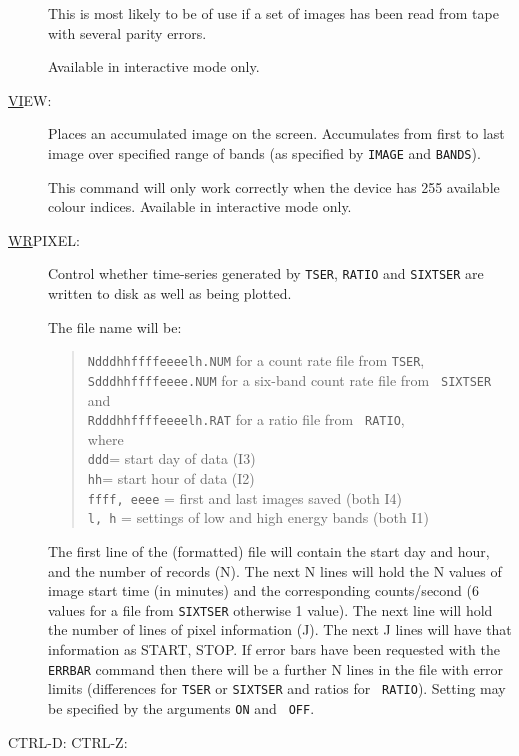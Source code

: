 \begin{description}
This is most likely to be of use if a set of images has been read from
tape with several parity errors.

Available in interactive mode only.

\item[\underline{VI}EW: ] \label{vi}
Places an accumulated image on the screen.  Accumulates from first to
last image over specified range of bands (as specified by {\tt IMAGE}
and {\tt BANDS}).

This command will only work correctly when the device has 255 available
colour indices.  Available in interactive mode only.

\item[\underline{WR}PIXEL: ]  \label{wr}
Control whether time-series generated by {\tt TSER}, {\tt RATIO} and
{\tt SIXTSER} are written to disk as well as being plotted.

The file name will be:
\begin{quote}
{\tt Ndddhhffffeeeelh.NUM} for a count rate file from {\tt TSER},\\
{\tt Sdddhhffffeeee.NUM} for a six-band count rate file from {\tt
SIXTSER} and \\ {\tt Rdddhhffffeeeelh.RAT} for a ratio file from {\tt
RATIO},\\ where\\ {\tt ddd}= start day of data (I3)\\ {\tt hh}= start
hour of data (I2)\\ {\tt ffff, eeee} = first and last images saved
(both I4)\\ {\tt l, h} = settings of low and high energy bands (both
I1)
\end{quote}

The first line of the (formatted) file will contain the start day and
hour, and the number of records (N).  The next N lines will hold the N
values of image start time (in minutes) and the corresponding
counts/second (6 values for a file from {\tt SIXTSER} otherwise 1
value).  The next line will hold the number of lines of pixel
information (J).  The next J lines will have that information as START,
STOP.  If error bars have been requested with the {\tt ERRBAR} command
then there will be a further N lines in the file with error limits
(differences for {\tt TSER} or {\tt SIXTSER} and ratios for {\tt
RATIO}).  Setting may be specified by the arguments {\tt ON} and {\tt
OFF}.


\item[CTRL-D: CTRL-Z:] \label{eof}


\end{description}
